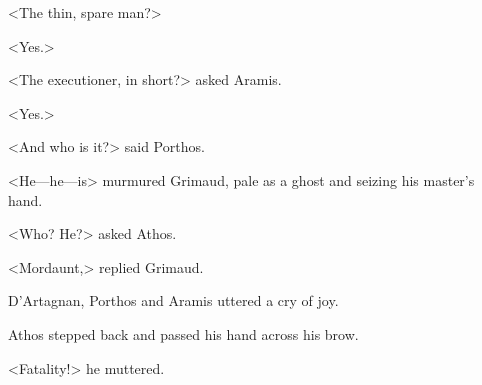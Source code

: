 <The thin, spare man?>

<Yes.>

<The executioner, in short?> asked Aramis.

<Yes.>

<And who is it?> said Porthos.

<He—he—is\longdash> murmured Grimaud, pale as a ghost and seizing his master's hand.

<Who? He?> asked Athos.

<Mordaunt,> replied Grimaud.

D'Artagnan, Porthos and Aramis uttered a cry of joy.

Athos stepped back and passed his hand across his brow.

<Fatality!> he muttered. 